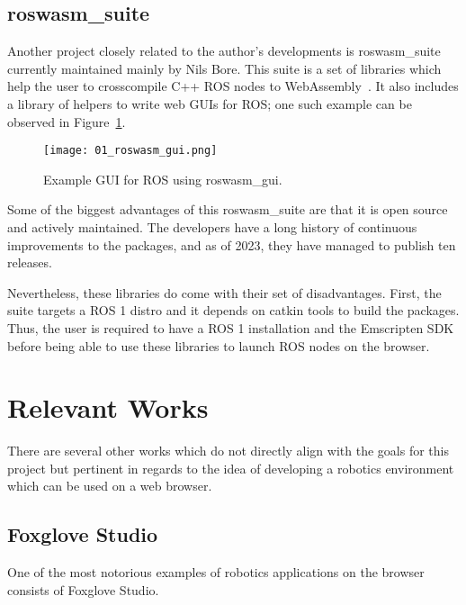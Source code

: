     \subsection{roswasm\_suite}

        Another project closely related to the author's developments is \textsf{roswasm\_suite} currently maintained mainly by Nils Bore. This suite is a set of libraries which help the user to cross\-compile C++ ROS nodes to WebAssembly~\cite{roswasmsuite}. It also includes a library of helpers to write web \ac{GUI}s for ROS; one such example can be observed in Figure~\ref{fig:roswasm_gui}.

        \begin{figure}[htbp]
            \centering
            \texttt{[image: 01\_roswasm\_gui.png]}
            \caption{Example \ac{GUI} for ROS using \textsf{roswasm\_gui}.}
            \label{fig:roswasm_gui}
        \end{figure}

        Some of the biggest advantages of this \textsf{roswasm\_suite} are that it is open source and actively maintained. The developers have a long history of continuous improvements to the packages, and as of 2023, they have managed to publish ten releases. 

        Nevertheless, these libraries do come with their set of disadvantages. First, the suite targets a \ac{ROS} 1 distro and it depends on \textsf{catkin} tools to build the packages. Thus, the user is required to have a \ac{ROS} 1 installation and the Emscripten \ac{SDK} before being able to use these libraries to launch \ac{ROS} nodes on the browser.


\section{Relevant Works}

    There are several other works which do not directly align with the goals for this project but pertinent in regards to the idea of developing a robotics environment which can be used on a web browser.

    \subsection{Foxglove Studio}

        One of the most notorious examples of robotics applications on the browser consists of Foxglove Studio.
        
